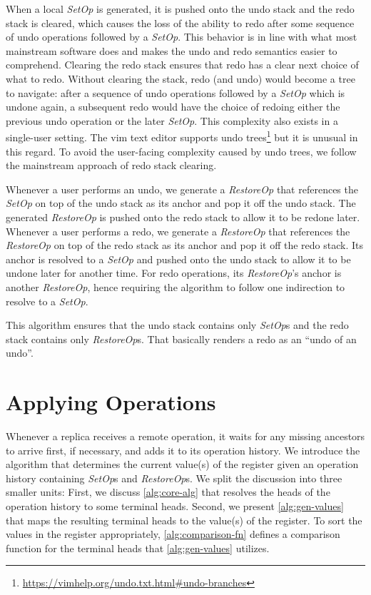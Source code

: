 \documentclass[sigplan,natbib=false,review]{acmart}
\newcommand{\setopkind}{\textit{SetOp}}
\newcommand{\restopkind}{\textit{RestoreOp}}
\begin{document}
When a local \setopkind{} is generated, it is pushed onto the undo stack and
the redo stack is cleared, which causes the loss of the ability to redo after
some sequence of undo operations followed by a \setopkind{}.
This behavior is in line with what most mainstream software does and makes the
undo and redo semantics easier to comprehend.
Clearing the redo stack ensures that redo has a clear next choice of what to redo.
Without clearing the stack, redo (and undo) would become a tree to navigate:
after a sequence of undo operations followed by a \setopkind{}
which is undone again, a subsequent redo would have the choice of redoing
either the previous undo operation or the later \setopkind{}.
This complexity also exists in a single-user setting.
The vim text editor supports undo trees\footnote{
  \url{https://vimhelp.org/undo.txt.html\#undo-branches}
} but it is unusual in this regard.
To avoid the user-facing complexity caused by undo trees,
we follow the mainstream approach of redo stack clearing.

Whenever a user performs an undo, we generate a \restopkind{} that
references the \setopkind{} on top of the undo stack as its anchor
and pop it off the undo stack.
The generated \restopkind{} is pushed onto the redo stack to allow it to be
redone later.
Whenever a user performs a redo, we generate a \restopkind{} that
references the \restopkind{} on top of the redo stack as its anchor and pop
it off the redo stack.
Its anchor is resolved to a \setopkind{} and
pushed onto the undo stack to allow it to be undone later for another time.
For redo operations, its \restopkind{}'s anchor is another \restopkind{},
hence requiring the algorithm to follow one indirection to resolve to a \setopkind{}.

This algorithm ensures that the undo stack contains only \setopkind{}s and
the redo stack contains only \restopkind{}s.
That basically renders a redo as an ``undo of an undo''.

\section{Applying Operations}\label{sec:implementation}

Whenever a replica receives a remote operation, it waits for any missing
ancestors to arrive first, if necessary, and adds it to its operation history.
We introduce the algorithm that determines the current value(s) of the
register given an operation history containing \setopkind{}s and \restopkind{}s.
We split the discussion into three smaller units:
First, we discuss \autoref{alg:core-alg} that resolves the heads of the operation
history to some terminal heads.
Second, we present \autoref{alg:gen-values} that maps the resulting terminal
heads to the value(s) of the register.
To sort the values in the register appropriately, \autoref{alg:comparison-fn}
defines a comparison function for the terminal heads that \autoref{alg:gen-values}
utilizes.
\end{document}
